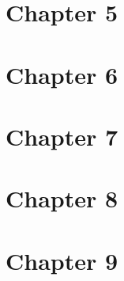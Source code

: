 \documentclass{wileySix}
\begin{document}
\chapter{Chapter 5}
%
%
%
%
%
%
%
%
%
%
%



\chapter{Chapter 6}
%
%
%
%
%
%
%
%
%
%
%



\chapter{Chapter 7}















\chapter{Chapter 8}






\chapter{Chapter 9}

\end{document}

